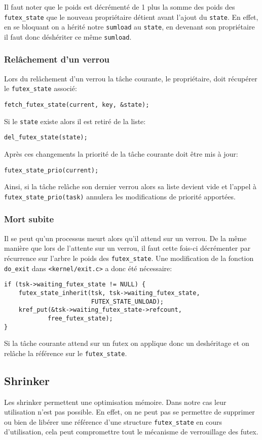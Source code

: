 Il faut noter que le poids est décrémenté de 1 plus la somme des poids des \verb|futex_state| 
que le nouveau propriétaire détient avant l'ajout du \verb|state|. En effet, en se bloquant on a hérité notre \verb|sumload| au \verb|state|, en devenant son propriétaire il faut donc déshériter ce même \verb|sumload|.

\subsubsection{Relâchement d'un verrou}

Lors du relâchement d'un verrou la tâche courante, le propriétaire, doit récupérer le \verb|futex_state| associé:
\begin{lstlisting}[tabsize=4]
	fetch_futex_state(current, key, &state);
\end{lstlisting}
Si le \verb|state| existe alors il est retiré de la liste:
\begin{lstlisting}[tabsize=4]
	del_futex_state(state);
\end{lstlisting}
Après ces changements la priorité de la tâche courante doit être mis à jour:
\begin{lstlisting}[tabsize=4]
	futex_state_prio(current);
\end{lstlisting}

Ainsi, si la tâche relâche son dernier verrou alors sa liste devient vide et l'appel
à \verb|futex_state_prio(task)| annulera les modifications de priorité apportées.

\subsubsection{Mort subite}

Il se peut qu'un processus meurt alors qu'il attend sur un verrou. De la même manière que lors de
l'attente sur un verrou, il faut cette fois-ci décrémenter par récurrence sur l'arbre 
le poids des \verb|futex_state|.
Une modification de la fonction \verb|do_exit| dans \verb|<kernel/exit.c>| a donc été nécessaire:
\begin{lstlisting}[tabsize=4]
if (tsk->waiting_futex_state != NULL) {
	futex_state_inherit(tsk, tsk->waiting_futex_state,
						FUTEX_STATE_UNLOAD);
	kref_put(&tsk->waiting_futex_state->refcount, 
			free_futex_state);
}
\end{lstlisting}

Si la tâche courante attend sur un futex on applique donc un deshéritage et on relâche la référence sur le
\verb|futex_state|. 

\subsection{Shrinker}

Les shrinker permettent une optimisation mémoire.
Dans notre cas leur utilisation n'est pas possible. En effet, on ne peut pas se permettre 
de supprimer ou bien de libérer une référence d'une structure \verb|futex_state| en cours 
d'utilisation, cela peut compromettre tout le mécanisme de verrouillage des futex.
